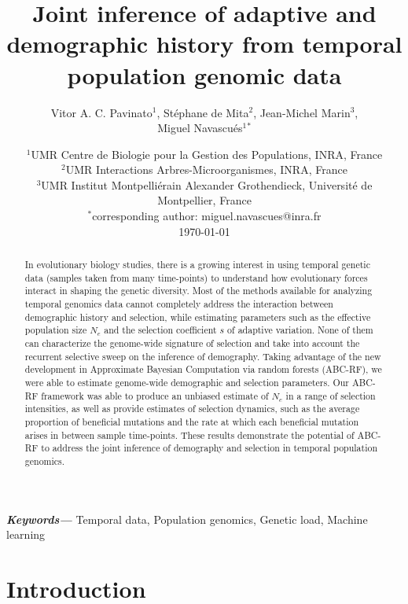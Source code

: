 \documentclass[12pt]{article}
\title{Joint inference of adaptive and demographic history from temporal population genomic data}
\author{Vitor A. C. Pavinato$^1$, Stéphane de Mita$^2$, Jean-Michel Marin$^3$, \\
			Miguel Navascués$^1$$^*$}
\date{{\myfont %
    $^1$UMR Centre de Biologie pour la Gestion des Populations, INRA, France\\%
    $^2$UMR Interactions Arbres-Microorganismes, INRA, France \\%
    $^3$UMR Institut Montpelliérain Alexander Grothendieck, Université de Montpellier, France\\%
    $^*$corresponding author: miguel.navascues@inra.fr\\[2ex]%
    }
    \today    
}
\providecommand{\keywords}[1]
{
  \small	
  \textbf{\textit{Keywords---}} #1
}
\begin{document}
\maketitle

\begin{abstract}
In evolutionary biology studies, there is a growing interest in using temporal genetic data (samples taken from many time-points) to understand how evolutionary forces interact in shaping the genetic diversity. Most of the methods available for analyzing temporal genomics data cannot completely address the interaction between demographic history and selection, while estimating parameters such as the effective population size $N_{e}$ and the selection coefficient $s$ of adaptive variation. None of them can characterize the genome-wide signature of selection and take into account the recurrent selective sweep on the inference of demography. Taking advantage of the new development in Approximate Bayesian Computation via random forests (ABC-RF), we were able to estimate genome-wide demographic and selection parameters. Our ABC-RF framework was able to produce an unbiased estimate of $N_{e}$ in a range of selection intensities, as well as provide estimates of selection dynamics, such as the average proportion of beneficial mutations and the rate at which each beneficial mutation arises in between sample time-points. These results demonstrate the potential of ABC-RF to address the joint inference of demography and selection in temporal population genomics.
\end{abstract} \hspace{10pt}

\keywords{Temporal data, Population genomics, Genetic load, Machine learning}

\newpage
\section*{Introduction}
\end{document}
